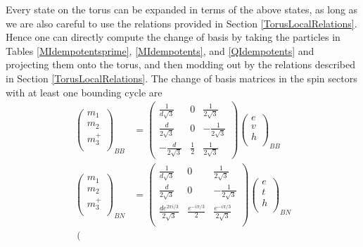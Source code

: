 Every state on the torus can be expanded in terms of the above states, as long 
as we are also careful to use the relations provided in Section \ref{TorusLocalRelations}.
Hence one can directly compute the change of basis by taking the particles in 
Tables \ref{MIdempotentsprime}, \ref{MIdempotents},  and \ref{QIdempotents} and 
projecting them onto the torus, and then modding out by the relations described in Section \ref{TorusLocalRelations}.
The change of basis matrices in the spin sectors with at least one bounding cycle are 
\begin{align}
\label{VAA}
\left( \begin{matrix}
{m}_1\\
{m}_2\\
m_3^+\\
\end{matrix} \right)_{BB} 
&= \left( \begin{matrix}
\frac{1}{d\sqrt{3}} & 0 & \frac{1}{2 \sqrt{3}} \\
\frac{d}{2 \sqrt{3}} & 0 & - \frac{1}{2 \sqrt{3}} \\
- \frac{d}{2 \sqrt{3}} & \frac{1}{2} & \frac{1}{2 \sqrt{3}}
\end{matrix} \right)
\left( \begin{matrix}
e\\
v\\
h\\
\end{matrix} \right)_{BB}\\
\label{VAP}  
\left( \begin{matrix}
{m}_1\\
{m}_2\\
m_3^+\\
\end{matrix} \right)_{BN}
&= \left( \begin{matrix}
\frac{1}{d\sqrt{3}} & 0 & \frac{1}{2 \sqrt{3}} \\
\frac{d}{2 \sqrt{3}} & 0 & - \frac{1}{2 \sqrt{3}} \\
\frac{d e^{2 \pi i/3}}{2 \sqrt{3}} & \frac{e^{- i \pi /3}}{2} & \frac{e^{- i \pi /3}}{2 \sqrt{3}}\\
\end{matrix} \right)
\left( \begin{matrix}
e\\
t\\
h\\
\end{matrix} \right)_{BN} \\
\label{VPA} 
\left( \begin{matrix}

\end{matrix}
\end{align}

